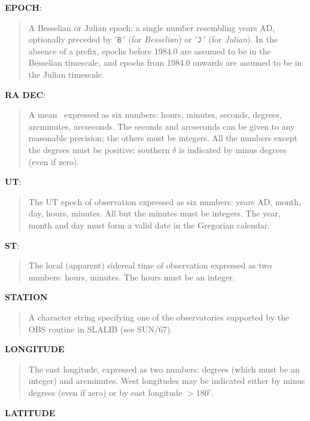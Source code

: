 \goodbreak
{\bf EPOCH}:

\begin{quote}
A Besselian or Julian epoch:  a single number resembling
years AD,
optionally preceded by $'${\tt B}$\,'$ (for
{\it Besselian}) or $'${\tt J}$\,'$ (for {\it Julian}).  In the
absence of a prefix, epochs before 1984.0 are assumed to
be in the Besselian timescale, and epochs from 1984.0 onwards
are assumed to be in the Julian timescale.
\end{quote}

\goodbreak
{\bf RA DEC}:

\begin{quote}
A mean \radec\, expressed as six numbers: hours,
minutes, seconds, degrees, arcminutes, arcseconds.
The seconds and arcseconds can be given to any reasonable
precision;  the others must be integers.
All the numbers except the degrees
must be positive; southern $\delta$ is indicated by
minus degrees (even if zero).
\end{quote}

\goodbreak
{\bf UT}:

\begin{quote}
The UT epoch of observation expressed as
six numbers: years AD, month, day, hours, minutes.
All but the minutes must be integers.
The year, month and day must form a valid date
in the Gregorian calendar.
\end{quote}

\goodbreak
{\bf ST}:

\begin{quote}
The local (apparent) sidereal time of observation expressed as
two numbers: hours, minutes.
The hours must be an integer.
\end{quote}

\goodbreak
{\bf STATION}

\begin{quote}
 A character string specifying one of the observatories
 supported by the OBS routine in SLALIB (see SUN/67).
\end{quote}

\goodbreak
{\bf LONGITUDE}

\begin{quote}
 The east longitude, expressed as two numbers: degrees (which
 must be an integer) and arcminutes.  West longitudes may
 be indicated
 either by minus degrees (even if zero) or by east
 longitude $> 180^\circ$.
\end{quote}

\goodbreak
{\bf LATITUDE}

